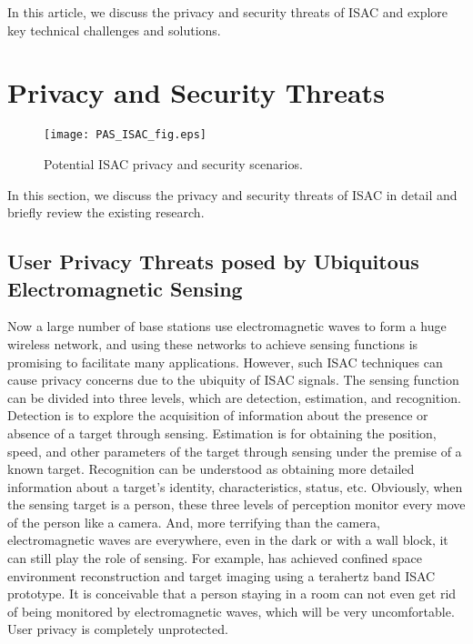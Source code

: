 \documentclass[10pt,journal,twocolumn,twoside]{IEEEtran} %
\begin{document}
In this article, we discuss the privacy and security threats of ISAC and explore key technical challenges and solutions.
\section{Privacy and Security Threats}
\begin{figure*}[htbp]
       \centering
        \texttt{[image: PAS\_ISAC\_fig.eps]}
       \caption{Potential ISAC privacy and security scenarios.}
       \label{Model}
\end{figure*}
In this section, we discuss the privacy and security threats of ISAC in detail and briefly review the existing research.

\subsection{User Privacy Threats posed by Ubiquitous Electromagnetic Sensing}
Now a large number of base stations use electromagnetic waves to form a huge wireless network, and using these networks to achieve sensing functions is promising to facilitate many applications. However, such ISAC techniques can cause privacy concerns due to the ubiquity of ISAC signals.
The sensing function can be divided into three levels, which are detection, estimation, and recognition. Detection is to explore the acquisition of information about the presence or absence of a target through sensing.
Estimation is for obtaining the position, speed, and other parameters of the target through sensing under the premise of a known target. Recognition can be understood as obtaining more detailed information about a target's identity, characteristics, status, etc. Obviously, when the sensing target is a person, these three levels of perception monitor every move of the person like a camera. And, more terrifying than the camera, electromagnetic waves are everywhere, even in the dark or with a wall block, it can still play the role of sensing. For example, \cite{zhongwen} has achieved confined space environment reconstruction and target imaging using a terahertz band ISAC prototype. It is conceivable that a person staying in a room can not even get rid of being monitored by electromagnetic waves, which will be very uncomfortable. User privacy is completely unprotected. 
\end{document}
